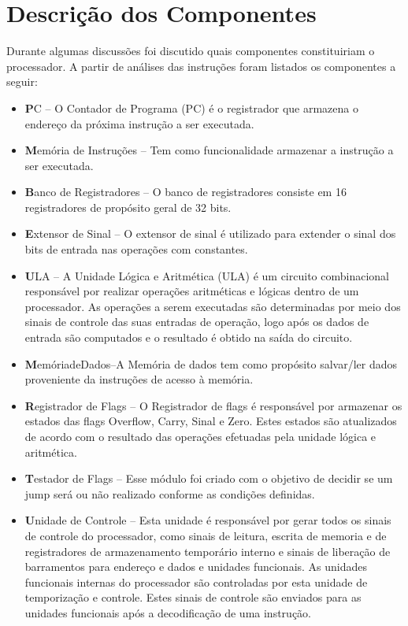 \documentclass{report}
\begin{document}
\chapter{Descrição dos Componentes}

Durante algumas discussões foi discutido quais  componentes constituiriam o processador. A partir de análises das instruções foram listados os componentes a seguir:\newline
\begin{itemize}
 \item \textbf PC – O Contador de Programa (PC) é o registrador que armazena o endereço da próxima instrução a ser executada. 
 
 \item \textbf Memória de Instruções –  Tem como funcionalidade armazenar a instrução a ser executada. 
 \item \textbf Banco de Registradores – O banco de registradores consiste em 16 registradores de propósito geral de 32 bits. 
 
 \item \textbf Extensor de Sinal – O extensor de sinal é utilizado para extender o sinal dos bits de entrada nas operações com constantes.
 
 \item \textbf ULA – A Unidade Lógica e Aritmética (ULA) é um circuito combinacional responsável por realizar operações aritméticas e lógicas dentro de um processador. As operações a serem executadas são determinadas por meio dos sinais de controle das suas entradas de operação, logo após os dados de entrada são computados e o resultado é obtido na saída do circuito. 
 
 \item \textbf MemóriadeDados–A Memória de dados tem como propósito salvar/ler dados proveniente da instruções de acesso à memória. 
 
 \item \textbf Registrador de Flags – O Registrador de flags é responsável por armazenar os estados das flags Overflow, Carry, Sinal e Zero. Estes estados são atualizados de acordo com o resultado das operações efetuadas pela unidade lógica e aritmética. 
 
 \item \textbf Testador de Flags – Esse módulo foi criado com o objetivo de decidir se um jump será ou não realizado conforme as condições definidas. 
 
 \item \textbf Unidade de Controle – Esta unidade é responsável por gerar todos os sinais de controle do processador, como sinais de leitura, escrita de memoria e de  registradores de armazenamento temporário interno e sinais de liberação de barramentos para endereço e dados e unidades funcionais. As unidades funcionais internas do processador são controladas por esta unidade de temporização e controle. Estes sinais de controle são enviados para as unidades funcionais após a decodificação de uma instrução.
\end{itemize}

  


% 
% 
\end{document}
